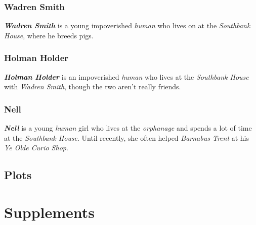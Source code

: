 \documentclass[11pt]{teraum_adventure}
\begin{document}
\subsubsection*{Wadren Smith}
\label{sec:org34c6992}
\textbf{\emph{Wadren Smith}} is a young impoverished \emph{human} who lives on at the
\emph{Southbank House}, where he breeds pigs.
\subsubsection*{Holman Holder}
\label{sec:org964f197}
\textbf{\emph{Holman Holder}} is an impoverished \emph{human} who lives at the
\emph{Southbank House} with \emph{Wadren Smith}, though the two aren't really friends.
\subsubsection*{Nell}
\label{sec:orgdef64e7}
\textbf{\emph{Nell}} is a young \emph{human} girl who lives at the \emph{orphanage} and
spends a lot of time at the \emph{Southbank House}. Until recently, she
often helped \emph{Barnabus Trent} at his \emph{Ye Olde Curio Shop}.
\subsection*{Plots}
\label{sec:org1f21562}
\section*{Supplements}
\label{sec:org5ee5049}
\end{document}
